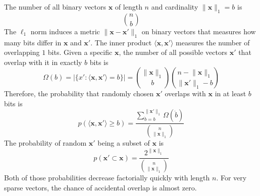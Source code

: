 \documentclass[12pt]{article}
\begin{document}
The number of all binary vectors $\boldsymbol{x}$ of length $n$ and cardinality $\lVert\boldsymbol{x}\rVert_1=b$ is
\[\binom{n}{b}\]
The $\ell_1$ norm induces a metric $\lVert\boldsymbol{x}-\boldsymbol{x}'\rVert_1$ on  binary vectors that measures how many bits differ in $\boldsymbol{x}$ and $\boldsymbol{x}'$. The inner product $\langle\boldsymbol{x},\boldsymbol{x}'\rangle$ measures the number of overlapping $1$ bits. 
Given a specific $\boldsymbol{x}$, the number of all possible vectors $\boldsymbol{x}'$ that overlap with it in exactly $b$ bits is 
\[
\Omega(b)=|\{x':\langle\boldsymbol{x},\boldsymbol{x}'\rangle=b\}|=\binom{\lVert\boldsymbol{x}\rVert_1}{b}\binom{n-\lVert\boldsymbol{x}\rVert_1}{\lVert\boldsymbol{x}'\rVert_1-b}
\]
Therefore, the probability that randomly chosen $\boldsymbol{x}'$ overlaps with $\boldsymbol{x}$ in at least $b$ bits is
\[p(\langle\boldsymbol{x},\boldsymbol{x}'\rangle\ge b )=\frac{\sum_{\dot{b}=b}^{\lVert\boldsymbol{x}'\rVert_1}\Omega(\dot{b})}{\binom{n}{\lVert\boldsymbol{x}\rVert_1}}\]
The probability of random $\boldsymbol{x}'$ being a subset of $\boldsymbol{x}$ is
\[p(\boldsymbol{x}'\subset\boldsymbol{x})=\frac{2^{\lVert\boldsymbol{x}\rVert_1}}{\binom{n}{\lVert\boldsymbol{x}\rVert_1}}\]
Both of those probabilities decrease factorially quickly with length $n$. For very sparse vectors, the chance of accidental overlap is almost zero. 
\end{document}
